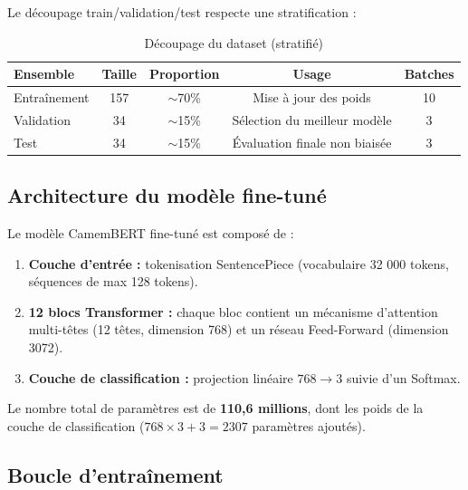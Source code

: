 Le découpage train/validation/test respecte une stratification :

\begin{table}[H]
\centering
\caption{Découpage du dataset (stratifié)}
\label{tab:split}
\renewcommand{\arraystretch}{1.4}
\begin{tabular}{lcccc}
\toprule
\rowcolor{bleuprincipal!15}
\textbf{Ensemble} & \textbf{Taille} & \textbf{Proportion} &
\textbf{Usage} & \textbf{Batches} \\
\midrule
Entraînement & 157 & $\sim$70\% & Mise à jour des poids & 10 \\
\rowcolor{gray!8}
Validation & 34 & $\sim$15\% & Sélection du meilleur modèle & 3 \\
Test & 34 & $\sim$15\% & Évaluation finale non biaisée & 3 \\
\bottomrule
\end{tabular}
\end{table}

\subsection{Architecture du modèle fine-tuné}

Le modèle CamemBERT fine-tuné est composé de :

\begin{enumerate}
  \item \textbf{Couche d'entrée :} tokenisation SentencePiece (vocabulaire
        32 000 tokens, séquences de max 128 tokens).
  \item \textbf{12 blocs Transformer :} chaque bloc contient un mécanisme
        d'attention multi-têtes (12 têtes, dimension 768) et un réseau
        Feed-Forward (dimension 3072).
  \item \textbf{Couche de classification :} projection linéaire
        $768 \rightarrow 3$ suivie d'un Softmax.
\end{enumerate}

Le nombre total de paramètres est de \textbf{110,6 millions}, dont les
poids de la couche de classification ($768 \times 3 + 3 = 2307$ paramètres
ajoutés).

\subsection{Boucle d'entraînement}


